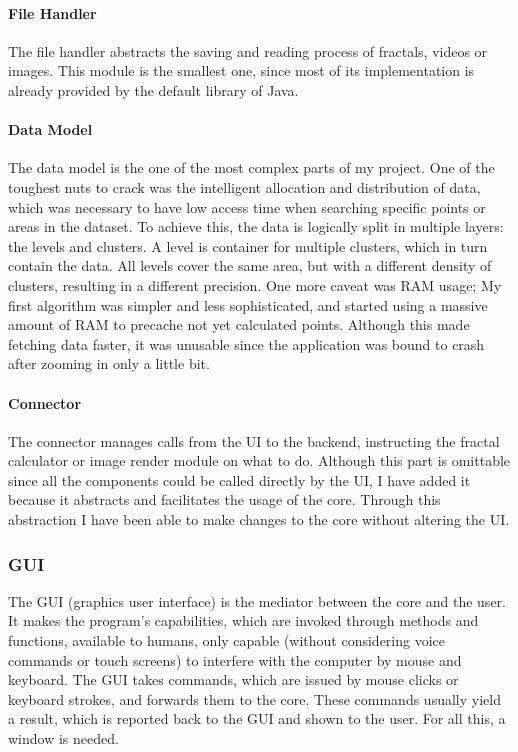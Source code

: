 \documentclass[10pt,a4paper,titlepage]{article}
\begin{document}
	\paragraph{File Handler}
	The file handler abstracts the saving and reading process of fractals, videos or images. This module is the smallest one, since most of its implementation is already provided by the default library of Java.
	\paragraph{Data Model}
	The data model is the one of the most complex parts of my project. One of the toughest nuts to crack was the intelligent allocation and distribution of data, which was necessary to have low access time when searching specific points or areas in the dataset. To achieve this, the data is logically split in multiple layers: the levels and clusters. A level is container for multiple clusters, which in turn contain the data. All levels cover the same area, but with a different density of clusters, resulting in a different precision. One more caveat was RAM usage; My first algorithm was simpler and less sophisticated, and started using a massive amount of RAM to precache not yet calculated points. Although this made fetching data faster, it was unusable since the application was bound to crash after zooming in only a little bit.\\
	\paragraph{Connector}
	The connector manages calls from the UI to the backend, instructing the fractal calculator or image render module on what to do. Although this part is omittable since all the components could be called directly by the UI, I have added it because it abstracts and facilitates the usage of the core. Through this abstraction I have been able to make changes to the core without altering the UI.
	\subsubsection{GUI}
	The GUI (graphics user interface) is the mediator between the core and the user. It makes the program's capabilities, which are invoked through methods and functions, available to humans, only capable (without considering voice commands or touch screens) to interfere with the computer by mouse and keyboard. The GUI takes commands, which are issued by mouse clicks or keyboard strokes, and forwards them to the core. These commands usually yield a result, which is reported back to the GUI and shown to the user. For all this, a window is needed.
\end{document}
